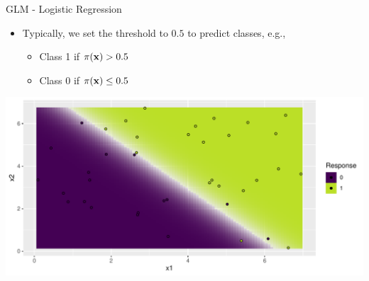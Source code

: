 \documentclass[10pt,compress,t,notes=noshow, xcolor=table]{beamer}
\begin{document}
\begin{frame}{GLM - Logistic Regression}

\begin{itemize}
    \item Typically, we set the threshold to $0.5$ to predict classes, e.g.,
    \begin{itemize}
        \item Class 1 if $\pi(\mathbf{x}) > 0.5$
        \item Class 0 if $\pi(\mathbf{x}) \leq 0.5$
    \end{itemize}
\end{itemize}

\medskip
\centering
\includegraphics[width = \textwidth]{figure/reg_class_log_6.pdf}
\end{frame}


\end{document}
